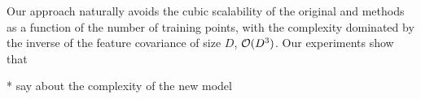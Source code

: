 Our approach naturally avoids the cubic scalability of the 
original \egp and \ugp methods as a function of the number 
of training points, with the complexity dominated by 
the inverse of the feature covariance of size $D$, 
$\mathcal{O}(D^3)$. Our experiments show that 


* say about the complexity of the new model 














